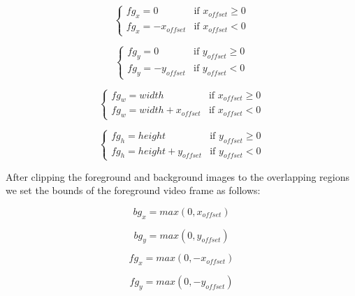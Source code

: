 \documentclass[ebook,12pt,oneside,openany]{memoir}
\begin{document}
\begin{equation}    
    \begin{cases} 
        fg_{x} = 0 & \text{if } x_{offset} \geq 0 \\
        fg_{x} = -x_{offset} & \text{if } x_{offset} < 0
    \end{cases}    
\end{equation}

\begin{equation}    
    \begin{cases} 
        fg_{y} = 0 & \text{if } y_{offset} \geq 0 \\
        fg_{y} = -y_{offset} & \text{if } y_{offset} < 0
    \end{cases}
\end{equation}

\begin{equation}    
    \begin{cases} 
        fg_{w} = width & \text{if } x_{offset} \geq 0 \\
        fg_{w} = width + x_{offset} & \text{if } x_{offset} < 0
    \end{cases}
\end{equation}

\begin{equation}    
    \begin{cases} 
        fg_{h} = height & \text{if } y_{offset} \geq 0 \\
        fg_{h} = height + y_{offset} & \text{if } y_{offset} < 0
    \end{cases}
\end{equation}

After clipping the foreground and background images to the overlapping regions we set the bounds of the foreground video frame as follows:

\begin{equation}
    bg_{x} = max(0, x_{offset})
\end{equation}

\begin{equation}
    bg_{y} = max(0, y_{offset})
\end{equation}

\begin{equation}
    fg_{x} = max(0, -x_{offset})
\end{equation}

\begin{equation}
    fg_{y} = max(0, -y_{offset})
\end{equation}
\end{document}
